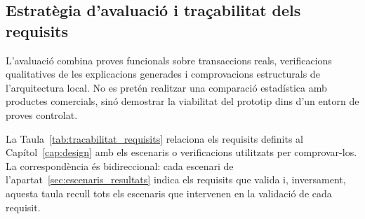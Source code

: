 \subsection{Estratègia d’avaluació i traçabilitat dels requisits}

L’avaluació combina proves funcionals sobre transaccions reals, verificacions qualitatives de les explicacions generades i comprovacions estructurals de l’arquitectura local. No es pretén realitzar una comparació estadística amb productes comercials, sinó demostrar la viabilitat del prototip dins d’un entorn de proves controlat.

La Taula~\ref{tab:tracabilitat_requisits} relaciona els requisits definits al Capítol~\ref{cap:design} amb els escenaris o verificacions utilitzats per comprovar-los. La correspondència és bidireccional: cada escenari de l'apartat~\ref{sec:escenaris_resultats} indica els requisits que valida i, inversament, aquesta taula recull tots els escenaris que intervenen en la validació de cada requisit.

